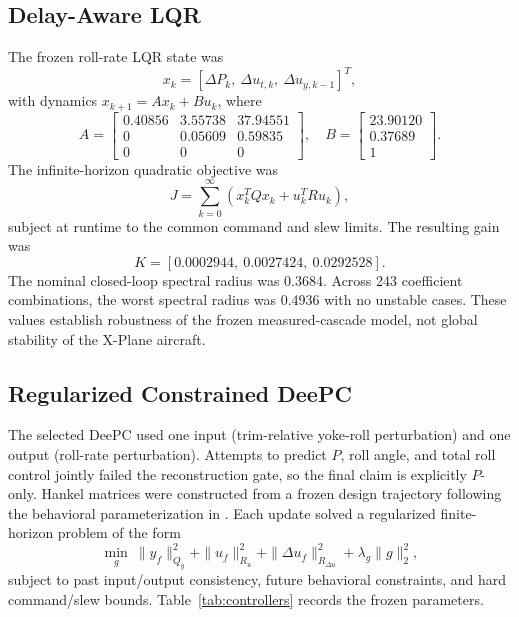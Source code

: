 \documentclass[conference]{IEEEtran}
\begin{document}
\subsection{Delay-Aware LQR}
The frozen roll-rate LQR state was
\begin{equation}
x_k=[\Delta P_k,\ \Delta u_{t,k},\ \Delta u_{y,k-1}]^T,
\end{equation}
with dynamics $x_{k+1}=Ax_k+Bu_k$, where
\begin{equation}
A=\begin{bmatrix}
0.40856&3.55738&37.94551\\
0&0.05609&0.59835\\
0&0&0
\end{bmatrix},\quad
B=\begin{bmatrix}23.90120\\0.37689\\1\end{bmatrix}.
\end{equation}
The infinite-horizon quadratic objective was
\begin{equation}
J=\sum_{k=0}^{\infty}\left(x_k^TQx_k+u_k^TRu_k\right),
\end{equation}
subject at runtime to the common command and slew limits. The resulting gain
was
\begin{equation}
K=[0.0002944,\ 0.0027424,\ 0.0292528].
\end{equation}
The nominal closed-loop spectral radius was 0.3684. Across 243 coefficient
combinations, the worst spectral radius was 0.4936 with no unstable cases.
These values establish robustness of the frozen measured-cascade model, not
global stability of the X-Plane aircraft.

\subsection{Regularized Constrained DeePC}
The selected DeePC used one input (trim-relative yoke-roll perturbation) and one
output (roll-rate perturbation). Attempts to predict $P$, roll angle, and total
roll control jointly failed the reconstruction gate, so the final claim is
explicitly $P$-only. Hankel matrices were constructed from a frozen design
trajectory following the behavioral parameterization in
\cite{willems2005,coulson2019}. Each update solved a regularized finite-horizon
problem of the form
\begin{equation}
\min_g\ \|y_f\|_{Q_y}^2+\|u_f\|_{R_u}^2+
\|\Delta u_f\|_{R_{\Delta u}}^2+\lambda_g\|g\|_2^2,
\label{eq:deepc}
\end{equation}
subject to past input/output consistency, future behavioral constraints, and
hard command/slew bounds. Table~\ref{tab:controllers} records the frozen
parameters.
\end{document}
